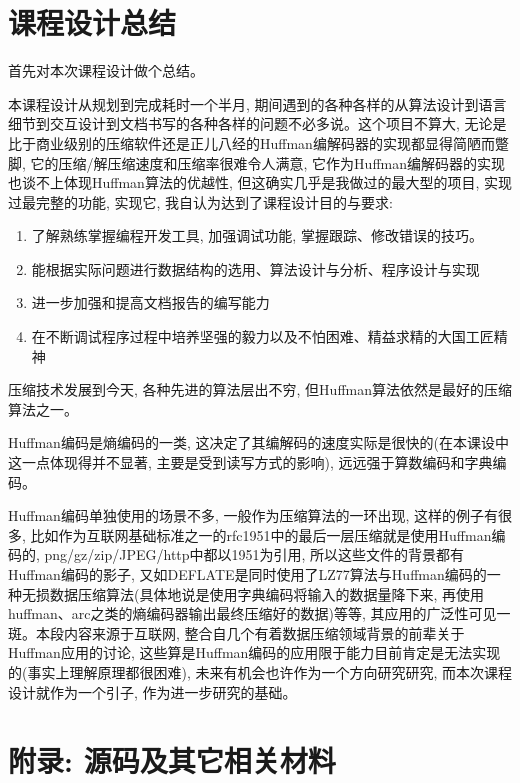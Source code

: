 \documentclass{ctexart}
\begin{document}

\section{课程设计总结}\label{header-n431}

首先对本次课程设计做个总结。

本课程设计从规划到完成耗时一个半月, 期间遇到的各种各样的从算法设计到语言细节到交互设计到文档书写的各种各样的问题不必多说。这个项目不算大, 无论是比于商业级别的压缩软件还是正儿八经的Huffman编解码器的实现都显得简陋而蹩脚, 它的压缩/解压缩速度和压缩率很难令人满意, 它作为Huffman编解码器的实现也谈不上体现Huffman算法的优越性, 但这确实几乎是我做过的最大型的项目, 实现过最完整的功能, 实现它,
我自认为达到了课程设计目的与要求:

\begin{enumerate}
\def\labelenumi{\arabic{enumi}.}
\item
  了解熟练掌握编程开发工具, 加强调试功能, 掌握跟踪、修改错误的技巧。
\item
  能根据实际问题进行数据结构的选用、算法设计与分析、程序设计与实现
\item
  进一步加强和提高文档报告的编写能力
\item
  在不断调试程序过程中培养坚强的毅力以及不怕困难、精益求精的大国工匠精神
\end{enumerate}

压缩技术发展到今天, 各种先进的算法层出不穷, 但Huffman算法依然是最好的压缩算法之一。

Huffman编码是熵编码的一类, 这决定了其编解码的速度实际是很快的(在本课设中这一点体现得并不显著,
主要是受到读写方式的影响), 远远强于算数编码和字典编码。

Huffman编码单独使用的场景不多, 一般作为压缩算法的一环出现, 这样的例子有很多, 比如作为互联网基础标准之一的rfc1951中的最后一层压缩就是使用Huffman编码的, png/gz/zip/JPEG/http中都以1951为引用,
所以这些文件的背景都有Huffman编码的影子, 又如DEFLATE是同时使用了LZ77算法与Huffman编码的一种无损数据压缩算法(具体地说是使用字典编码将输入的数据量降下来, 再使用huffman、arc之类的熵编码器输出最终压缩好的数据)等等, 其应用的广泛性可见一斑。本段内容来源于互联网, 整合自几个有着数据压缩领域背景的前辈关于Huffman应用的讨论, 这些算是Huffman编码的应用限于能力目前肯定是无法实现的(事实上理解原理都很困难), 未来有机会也许作为一个方向研究研究, 而本次课程设计就作为一个引子, 作为进一步研究的基础。


\section{附录: 源码及其它相关材料}\label{header-n478}
\end{document}
